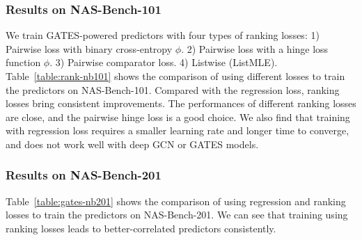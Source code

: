 \documentclass[runningheads]{llncs}
\begin{document}
\subsubsection{Results on NAS-Bench-101}
We train GATES-powered predictors with four types of ranking losses: 1) Pairwise loss with binary cross-entropy $\phi$. 2) Pairwise loss with a hinge loss function $\phi$. 3) Pairwise comparator loss. 4) Listwise (ListMLE).
Table~\ref{table:rank-nb101} shows the comparison of using different losses to train the predictors on NAS-Bench-101. Compared with the regression loss, ranking losses bring consistent improvements.
The performances of different ranking losses are close, and the pairwise hinge loss is a good choice. We also find that training with regression loss requires a smaller learning rate and longer time to converge, and does not work well with 
deep GCN or GATES models.

\subsubsection{Results on NAS-Bench-201}
Table~\ref{table:gates-nb201} shows the comparison of using regression and ranking losses to train the predictors on NAS-Bench-201. We can see that training using ranking losses leads to better-correlated predictors consistently.
\end{document}
